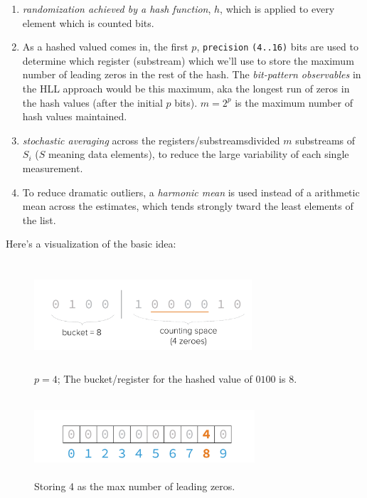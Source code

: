 \documentclass[12pt]{article}
\begin{document}
\begin{enumerate}
\item \textit{randomization achieved by a hash function}, $h$, which is applied
  to every element which is counted bits.
\item As a hashed valued comes in, the first $p$, \texttt{precision}
  \texttt{(4..16)} bits are used to determine which register (substream) which
  we'll use to store the maximum number of leading zeros in the rest of the
  hash. The \textit{bit-pattern observables} in the HLL approach would be this
  maximum, aka the longest run of zeros in the hash values (after the initial
  $p$ bits). $m = 2^p$ is the maximum number of hash values maintained.
\item \textit{stochastic averaging} across the
  registers/substreams\textemdash divided $m$ substreams of $S_i$
  ($S$ meaning data elements), to reduce the large variability of each single
  measurement.
\item To reduce dramatic outliers, a \textit{harmonic mean} is used instead of
  a arithmetic mean across the estimates, which tends strongly tward the least
  elements of the list\cite{Harmonic-mean:Online}.
\end{enumerate}

Here's a visualization of the basic idea\cite{Kiip:Online}:

\begin{figure}[H]
\centering
\includegraphics[width=8.1cm, height=4cm]{bucket-run}
\caption{$p=4$; The bucket/register for the hashed value of $0100$ is $8$.}
\label{figurebucketrun}
\end{figure}

\begin{figure}[H]
\centering
\includegraphics[width=8.2cm, height=3cm]{register-store}
\caption{Storing 4 as the max number of leading zeros.}
\label{figurestoreregister}
\end{figure}
\end{document}
